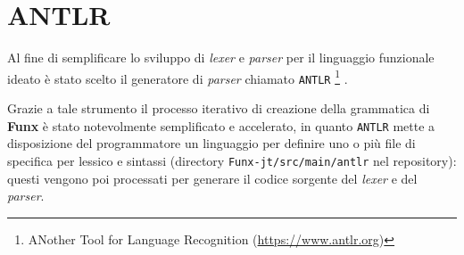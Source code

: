 \section{ANTLR}
\label{sec:5-1-antlr}

Al fine di semplificare lo sviluppo di \textit{lexer} e \textit{parser} per il linguaggio funzionale ideato
è stato scelto il generatore di \textit{parser} chiamato \texttt{ANTLR}%
\footnote{ANother Tool for Language Recognition (\url{https://www.antlr.org})}
\cite{Parr-1995-ANTLRGenerator,Parr-2013-DefinitiveANTLR}.

\noindent Grazie a tale strumento il processo iterativo di creazione della grammatica di \textbf{Funx}
è stato notevolmente semplificato e accelerato, in quanto \texttt{ANTLR} mette a disposizione del programmatore
un linguaggio per definire uno o più file di specifica per lessico e sintassi
(directory \texttt{Funx-jt/src/main/antlr} nel repository): questi vengono poi processati
per generare il codice sorgente del \textit{lexer} e del \textit{parser}.



